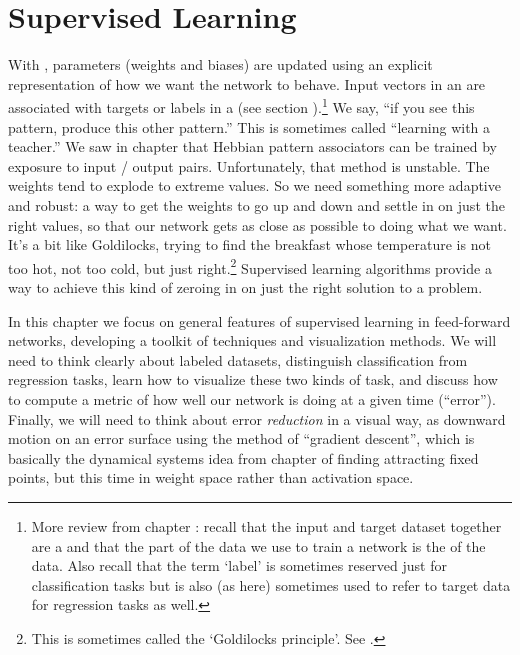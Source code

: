 \chapter{Supervised Learning}\label{ch_supervised}


With , parameters (weights and biases) are updated using an explicit representation of how we want the network to behave. Input vectors in an  are associated with targets or labels in a  (see section ).\footnote{More review from chapter : recall that the input and target dataset together are a  and that the part of the data we use to train a network is the  of the data. Also recall that the term `label' is sometimes reserved just for classification tasks but is also (as here) sometimes used to refer to target data for regression tasks as well.}  We say, ``if you see this pattern, produce this other pattern.'' This is sometimes called ``learning with a teacher.'' We saw in chapter  that Hebbian pattern associators can be trained by exposure to input / output pairs. Unfortunately, that method is unstable. The weights tend to explode to extreme values. So we need something more adaptive and robust: a way to get the weights to go up and down and settle in on just the right values, so that our network gets as close as possible to doing what we want. It's a bit like Goldilocks, trying to find the breakfast whose temperature is not too hot, not too cold, but just right.\footnote{This is sometimes called the `Goldilocks principle'. See .} Supervised learning algorithms provide a way to achieve this kind of zeroing in on just the right solution to a problem.

In this chapter we focus on general features of supervised learning in feed-forward networks, developing a toolkit of  techniques and visualization methods. We will need to think clearly about labeled datasets, distinguish classification from regression tasks, learn how to visualize these two kinds of task, and discuss how to compute a metric of how well our network is doing at a given time (``error''). Finally, we will need to think about error \emph{reduction} in a visual way, as downward motion on an error surface using the method of ``gradient descent'', which is basically the dynamical systems idea from chapter  of finding attracting fixed points, but this time in weight space rather than activation space.

